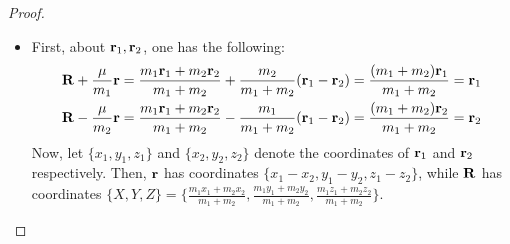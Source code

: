 \documentclass{article}
\begin{document}
\begin{proof}

    \hfil

    \begin{itemize}
        \item[(a)] First, about $\mathbf{r}_1,\mathbf{r}_2$, one has the following:
        \begin{align}
            &\mathbf{R}+\frac{\mu}{m_1}\mathbf{r} = \frac{m_1\mathbf{r}_1+m_2\mathbf{r}_2}{m_1+m_2} + \frac{m_2}{m_1+m_2}(\mathbf{r}_1-\mathbf{r}_2) = \frac{(m_1+m_2)\mathbf{r}_1}{m_1+m_2}=\mathbf{r}_1\\
            &\mathbf{R}-\frac{\mu}{m_2}\mathbf{r} = \frac{m_1\mathbf{r}_1+m_2\mathbf{r}_2}{m_1+m_2}-\frac{m_1}{m_1+m_2}(\mathbf{r}_1-\mathbf{r}_2) = \frac{(m_1+m_2)\mathbf{r}_2}{m_1+m_2} = \mathbf{r}_2
        \end{align}
        Now, let $\{x_1,y_1,z_1\}$ and $\{x_2,y_2,z_2\}$ denote the coordinates of $\mathbf{r}_1$ and $\mathbf{r}_2$ respectively. Then, $\mathbf{r}$ has coordinates $\{x_1-x_2,y_1-y_2,z_1-z_2\}$, while $\mathbf{R}$ has coordinates $\{X,Y,Z\}= \{\frac{m_1x_1+m_2x_2}{m_1+m_2},\frac{m_1y_1+m_2y_2}{m_1+m_2},\frac{m_1z_1+m_2z_2}{m_1+m_2}\}$.


\end{itemize}
\end{proof}
\end{document}
